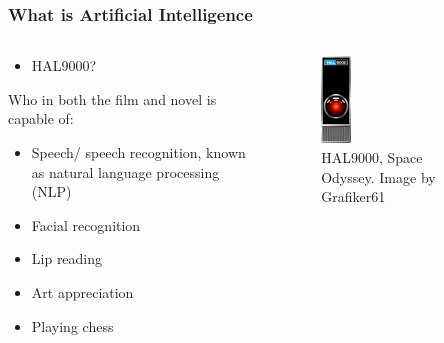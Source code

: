 \documentclass[aspectratio=169]{beamer}
\begin{document}
  \begin{frame}
    \frametitle{What is Artificial Intelligence}
    \begin{columns}
      \begin{column}{0.5\textwidth}
        \begin{itemize}
          \item HAL9000?
        \end{itemize}
        Who in both the film and novel is capable of:
        \begin{itemize}
          \item Speech/ speech recognition, known as natural language processing (NLP)
          \item Facial recognition
          \item Lip reading
          \item Art appreciation
          \item Playing chess
        \end{itemize}
      \end{column}
      \begin{column}{0.5\textwidth}
        \begin{figure}[th!]
          \centering
          \includegraphics[width=0.2\textwidth]{hal9000.pdf}
          \caption{HAL9000, Space Odyssey. Image by Grafiker61}
          \label{fig:jim_carrey}
        \end{figure}
      \end{column}
    \end{columns}
  \end{frame}
\end{document}
